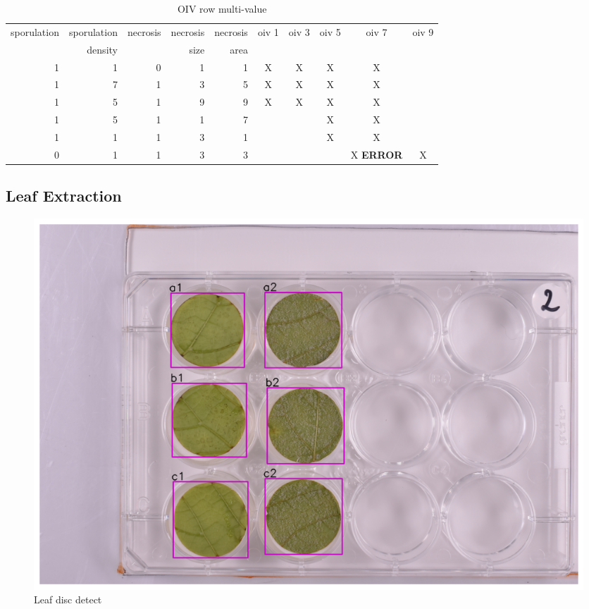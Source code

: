 \documentclass[english]{article}
\begin{document}
\begin{table}[H]
	\centering
	\caption{OIV row multi-value}\label{tab:oivconfusion}
	\begin{tabular}{rrrrrccccc}
		\toprule
		sporulation & sporulation & necrosis & necrosis & necrosis & oiv 1 & oiv 3 & oiv 5 & oiv 7 & oiv 9 \\
		{}          & density     & {}       & size     & area     & {}    & {}    & {}    & {}    & {}    \\
		\midrule
		1           & 1           & 0        & 1        & 1        & X     & X     & X     & X     &       \\
		1           & 7           & 1        & 3        & 5        & X     & X     & X     & X     &       \\
		1           & 5           & 1        & 9        & 9        & X     & X     & X     & X     &       \\
		1           & 5           & 1        & 1        & 7        &       &       & X     & X     &       \\
		1           & 1           & 1        & 3        & 1        &       &       & X     & X     &       \\
		0           & 1           & 1        & 3        & 3        &       &       &       & X \textbf{ERROR}     & X     \\
		\bottomrule
	\end{tabular}
\end{table}

\subsection{Leaf Extraction}

\begin{figure}
	\centering
	\includegraphics[width=0.8\linewidth]{plate_index_v2_fixed.png}
	\caption*{Leaf disc detect }
\end{figure}
\end{document}
